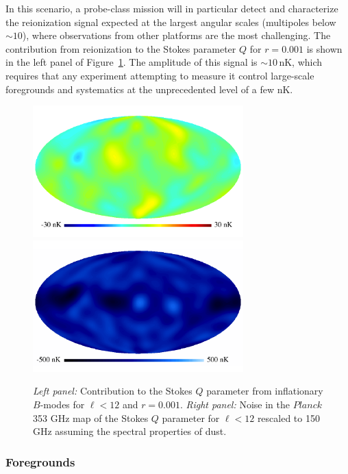 In this scenario, a probe-class mission will in particular detect and
characterize the reionization signal expected at the largest angular
scales (multipoles below $\sim\!10$), where observations from other
platforms are the most challenging. The contribution from reionization
to the Stokes parameter $Q$ for $r=0.001$ is shown in the left panel
of Figure~\ref{fig:Qrp001}. The amplitude of this signal is
$\sim\!10$\,nK, which requires that any experiment attempting to
measure it control large-scale foregrounds and systematics at the
unprecedented level of a few nK.

\begin{figure}[h]
\begin{center}
\includegraphics[width=3.2in]{Figures/P15_2_12_rp001.pdf}
\includegraphics[width=3.2in]{Figures/P353_N_2_12.pdf}
\end{center}
\caption{\small {\it Left panel:} Contribution to the Stokes $Q$
  parameter from inflationary $B$-modes for $\ell<12$ and
  $r=0.001$. {\it Right panel:} Noise in the $Planck$ 353 GHz map of
  the Stokes $Q$ parameter for $\ell<12$ rescaled to 150\,GHz assuming
  the spectral properties of dust.}
\label{fig:Qrp001}
\end{figure}

\subsubsection{Foregrounds}

